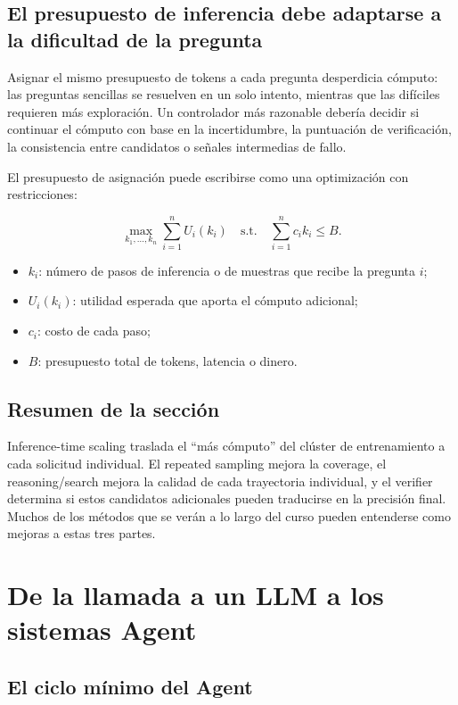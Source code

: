 \documentclass[a4paper]{article}
\begin{document}
\subsection{El presupuesto de inferencia debe adaptarse a la dificultad de la pregunta}

Asignar el mismo presupuesto de tokens a cada pregunta desperdicia cómputo: las preguntas sencillas se resuelven en un solo intento, mientras que las difíciles requieren más exploración. Un controlador más razonable debería decidir si continuar el cómputo con base en la incertidumbre, la puntuación de verificación, la consistencia entre candidatos o señales intermedias de fallo.

El presupuesto de asignación puede escribirse como una optimización con restricciones:

$$
\max_{k_1,\ldots,k_n}\sum_{i=1}^{n} U_i(k_i)
\quad\text{s.t.}\quad
\sum_{i=1}^{n} c_i k_i\le B.
$$

\begin{itemize}
    \item $k_i$: número de pasos de inferencia o de muestras que recibe la pregunta $i$;
    \item $U_i(k_i)$: utilidad esperada que aporta el cómputo adicional;
    \item $c_i$: costo de cada paso;
    \item $B$: presupuesto total de tokens, latencia o dinero.
\end{itemize}

\subsection{Resumen de la sección}

Inference-time scaling traslada el ``más cómputo'' del clúster de entrenamiento a cada solicitud individual. El repeated sampling mejora la coverage, el reasoning/search mejora la calidad de cada trayectoria individual, y el verifier determina si estos candidatos adicionales pueden traducirse en la precisión final. Muchos de los métodos que se verán a lo largo del curso pueden entenderse como mejoras a estas tres partes.
\section{De la llamada a un LLM a los sistemas Agent}

\subsection{El ciclo mínimo del Agent}
\end{document}
